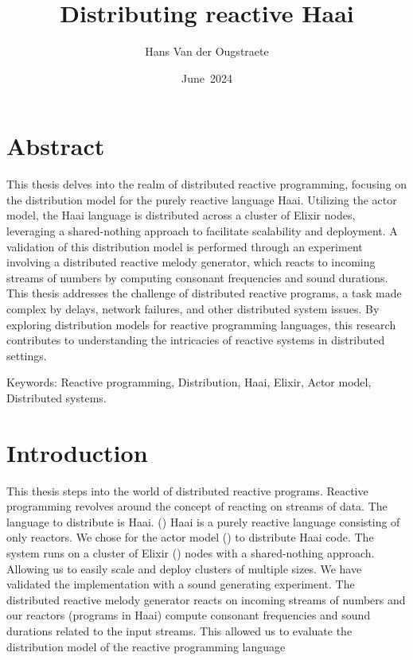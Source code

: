 \documentclass[a4paper]{book}
\title{Distributing reactive Haai}
\author{Hans Van der Ougstraete}
\date{June~2024}
\begin{document}
\frontmatter
\maketitle%


\chapter{Abstract}
This thesis delves into the realm of distributed reactive programming, focusing on the distribution model for the purely reactive language Haai. Utilizing the actor model, the Haai language is distributed across a cluster of Elixir nodes, leveraging a shared-nothing approach to facilitate scalability and deployment. A validation of this distribution model is performed through an experiment involving a distributed reactive melody generator, which reacts to incoming streams of numbers by computing consonant frequencies and sound durations. This thesis addresses the challenge of distributed reactive programs, a task made complex by delays, network failures, and other distributed system issues. By exploring distribution models for reactive programming languages, this research contributes to understanding the intricacies of reactive systems in distributed settings.

Keywords: Reactive programming, Distribution, Haai, Elixir, Actor model, Distributed systems.


\tableofcontents%

\mainmatter%
\chapter{Introduction}
This thesis steps into the world of distributed reactive programs. Reactive programming revolves around the concept of reacting on streams of data. The language to distribute is Haai. (\cite{oeyen_reactive_2024}) Haai is a purely reactive language consisting of only reactors. We chose for the actor model (\cite{de_koster_43_2016}) to distribute Haai code. The system runs on a cluster of Elixir (\cite{juric2024elixir}) nodes with a shared-nothing approach. Allowing us to easily scale and deploy clusters of multiple sizes. We have validated the implementation with a sound generating experiment. The distributed reactive melody generator reacts on incoming streams of numbers and our reactors (programs in Haai) compute consonant frequencies and sound durations related to the input streams. This allowed us to evaluate the distribution model of the reactive programming language 
\end{document}
